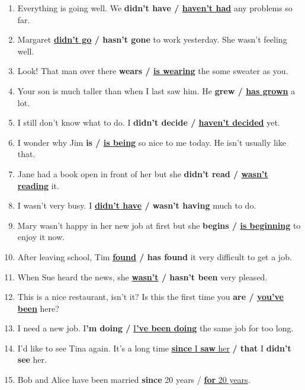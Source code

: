 \documentclass[main.tex]{subfiles}
\begin{document}
\begin{enumerate}[nosep,leftmargin=*]
	\itemsep\eitsp
	\setcounter{enumi}{5}
	\item Everything is going well. We \textbf{didn't have / \uline{haven't had}} any problems so far.
	\item Margaret \textbf{\uline{didn't go} / hasn't gone} to work yesterday. She wasn't feeling well.
	\item Look! That man over there \textbf{wears / \uline{is wearing}} the some sweater as you.
	\item Your son is much taller than when I last saw him. He \textbf{grew / \uline{has grown}} a lot.
	\item I still don't know what to do. I \textbf{didn't decide / \uline{haven't decided}} yet.
	\item I wonder why Jim \textbf{is / \uline{is being}} so nice to me today. He isn't usually like that.
	\item Jane had a book open in front of her but she \textbf{didn't read / \uline{wasn't reading}} it.
	\item I wasn't very busy. I \textbf{\uline{didn't have} / wasn't having} much to do.
	\item Mary wasn't happy in her new job at first but she \textbf{begins / \uline{is beginning}} to enjoy it now.
	\item After leaving school, Tim \textbf{\uline{found} / has found} it very difficult to get a job.
	\item When Sue heard the news, she \textbf{\uline{wasn't} / hasn't been} very pleased.
	\item This is a nice restaurant, isn't it? Is this the first time you \textbf{are / \uline{you've been}} here?
	\item I need a new job. I\textbf{'m doing /} \uline{I\textbf{'ve been doing}} the same job for too long.
	\item I'd like to see Tina again. It's a long time \uline{\textbf{since} I \textbf{saw} her} \textbf{/ that} I \textbf{didn't see} her.
	\item Bob and Alice have been married \textbf{since} 20 years / \uline{\textbf{for} 20 years}.
\end{enumerate}
\end{document}
